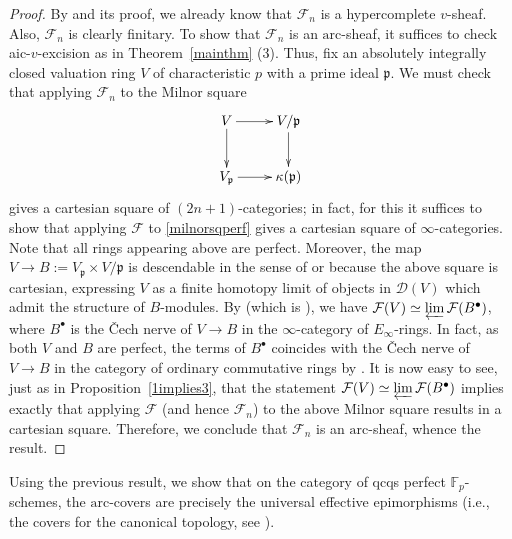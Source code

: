 \documentclass[reqno]{amsart}
\newcommand{\arc}{\mathrm{arc}}
\newcommand{\D}{\mathcal{D}}
\theoremstyle{definition}
\begin{document}
\begin{proof}
By \cite[Theorem 11.2 (2)]{BhattScholzeWitt} and its proof, we already know that
$\mathcal{F}_n$
is a hypercomplete $v$-sheaf. Also, $\mathcal{F}_n$ is clearly finitary. To show
that $\mathcal{F}_n$ is an $\arc$-sheaf, it suffices to check aic-$v$-excision as in
Theorem~\ref{mainthm} (3). Thus, fix an absolutely integrally closed valuation
ring $V$ of characteristic $p$ with a prime ideal $\mathfrak{p}$. We must check
that applying $\mathcal{F}_n$ to the Milnor square
\begin{equation}  \label{milnorsqperf}
\begin{aligned}
\xymatrix{
V \ar[d] \ar[r] &  V/\mathfrak{p} \ar[d] \\
V_{\mathfrak{p}} \ar[r] &  \kappa(\mathfrak{p})} \end{aligned} \end{equation}
gives a cartesian square of $(2n+1)$-categories; in fact, for this it suffices
to show that 
applying $\mathcal{F}$ to \eqref{milnorsqperf} gives a cartesian square of
$\infty$-categories. Note that all rings appearing
above are perfect. Moreover, the map $V \to B := V_{\mathfrak{p}} \times
V/\mathfrak{p}$ is descendable in the sense of \cite[Definition
11.14]{BhattScholzeWitt} 
or \cite[Definition~3.18]{MathewGalois} 
because the above square is cartesian, expressing $V$ as a
finite homotopy limit of objects in $\D(V)$ which admit the structure of
$B$-modules. By \cite[Theorem 11.15]{BhattScholzeWitt} (which is
\cite[Proposition 3.21]{MathewGalois}), we have $\mathcal{F}(V) \simeq
\varprojlim \mathcal{F}(B^\bullet)$, where $B^\bullet$ is the \v{C}ech nerve of
$V \to B$ in the $\infty$-category of $E_\infty$-rings. In fact, as both $V$ and
$B$ are perfect, the terms of $B^\bullet$ coincides with the \v{C}ech nerve of
$V \to B$ in the category of ordinary commutative rings by \cite[Lemma
3.16]{BhattScholzeWitt}. It is now easy to see, just as in
Proposition~\ref{1implies3}, that the statement $\mathcal{F}(V) \simeq
\varprojlim \mathcal{F}(B^\bullet)$ implies exactly that applying $\mathcal{F}$
(and hence $\mathcal{F}_n$) to the above Milnor square results in a cartesian
square. Therefore, we conclude that $\mathcal{F}_n$ is an
$\arc$-sheaf, whence the result. \end{proof}


Using the previous result, we show that on the category of qcqs perfect $\mathbb{F}_p$-schemes, the $\arc$-covers are precisely the universal effective epimorphisms (i.e., the covers for the canonical topology, see \cite[Tag 00WP]{stacks-project}).
\end{document}
